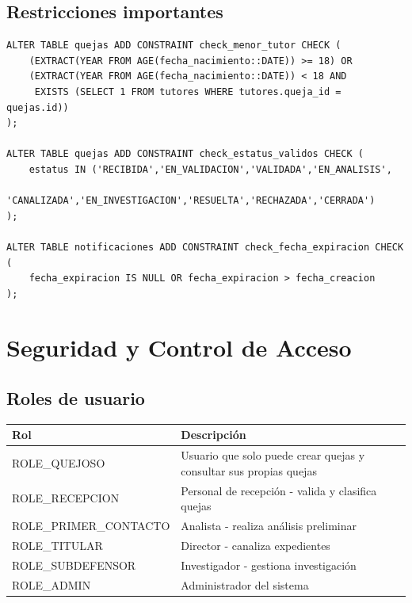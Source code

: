 \documentclass[11pt,letterpaper]{article}
\begin{document}
\subsection{Restricciones importantes}
\begin{lstlisting}
ALTER TABLE quejas ADD CONSTRAINT check_menor_tutor CHECK (
    (EXTRACT(YEAR FROM AGE(fecha_nacimiento::DATE)) >= 18) OR 
    (EXTRACT(YEAR FROM AGE(fecha_nacimiento::DATE)) < 18 AND 
     EXISTS (SELECT 1 FROM tutores WHERE tutores.queja_id = quejas.id))
);

ALTER TABLE quejas ADD CONSTRAINT check_estatus_validos CHECK (
    estatus IN ('RECIBIDA','EN_VALIDACION','VALIDADA','EN_ANALISIS',
                'CANALIZADA','EN_INVESTIGACION','RESUELTA','RECHAZADA','CERRADA')
);

ALTER TABLE notificaciones ADD CONSTRAINT check_fecha_expiracion CHECK (
    fecha_expiracion IS NULL OR fecha_expiracion > fecha_creacion
);
\end{lstlisting}

\section{Seguridad y Control de Acceso}

\subsection{Roles de usuario}
\begin{longtable}{|p{4cm}|p{9cm}|}
\hline
\rowcolor{lightgray} \textbf{Rol} & \textbf{Descripción} \\
\hline
ROLE\_QUEJOSO & Usuario que solo puede crear quejas y consultar sus propias quejas \\
\hline
ROLE\_RECEPCION & Personal de recepción - valida y clasifica quejas \\
\hline
ROLE\_PRIMER\_CONTACTO & Analista - realiza análisis preliminar \\
\hline
ROLE\_TITULAR & Director - canaliza expedientes \\
\hline
ROLE\_SUBDEFENSOR & Investigador - gestiona investigación \\
\hline
ROLE\_ADMIN & Administrador del sistema \\
\hline
\end{longtable}
\end{document}
